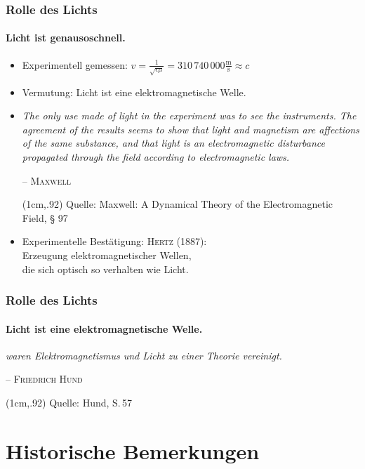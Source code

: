 \documentclass[green,10pt]{beamer}
\newcommand{\vtiny}{\fontsize{6}{1}\selectfont}
\newcommand{\zitat}[2]{
  \textit{\frqq#1 \flqq}\\
  \begin{flushright}
    -- #2
  \end{flushright}
}
\newcommand{\quelle}[1]{
  \begin{textblock*}{\linewidth}(1cm,.92\paperheight)
    \vtiny Quelle: #1
  \end{textblock*}
}
\newcommand{\name}[1]{
  \textsc{#1}
}
\newcommand{\adtef}{A Dynamical Theory of the Electromagnetic Field}
\begin{document}
    \begin{frame}
      \frametitle{Rolle des Lichts}
      \framesubtitle{Licht ist genausoschnell.}
      \begin{itemize}[<+->]
        \item Experimentell gemessen: $ v = \frac{1}{\sqrt{\epsilon\mu}} = 310\,740\,000 \frac{\text{m}}{\text{s}} \approx c $
        \item Vermutung: Licht ist eine elektromagnetische Welle.
        \item \zitat{The only use made of light in the experiment was to see the instruments.
            The agreement of the results seems to show that light and magnetism are affections of the same substance, and that light is an electromagnetic disturbance propagated through the field according to electromagnetic laws.
          }{\name{Maxwell}}
          \quelle{Maxwell: \adtef, § 97}
        \item Experimentelle Bestätigung: \name{Hertz} (1887): \\ Erzeugung elektromagnetischer Wellen, \\ die sich optisch so verhalten wie Licht.
      \end{itemize}
    \end{frame}    
    \begin{frame}
      \frametitle{Rolle des Lichts}
      \framesubtitle{Licht ist eine elektromagnetische Welle.}
      \zitat{1864 waren Elektromagnetismus und Licht zu einer Theorie vereinigt.}{\name{Friedrich Hund}}    
      \quelle{Hund, S.\,57}
    \end{frame}    
    
\section{Historische Bemerkungen}

  
\end{document}
